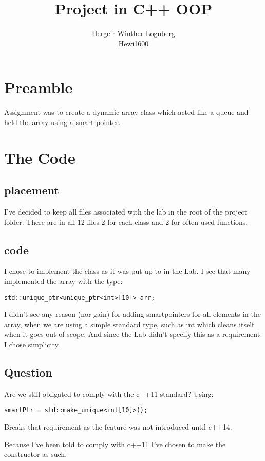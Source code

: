 \documentclass[11pt]{article}
\title{\textbf{Project in C++ OOP}}
\author{Hergeir Winther Lognberg \\
Hewi1600}
\date{}
\begin{document}
\maketitle

\section{Preamble}

Assignment was to create a dynamic array class which acted like a queue and held the array using a smart pointer.

\section{The Code}
\subsection{placement}
I've decided to keep all files associated with the lab in the root of the project folder. There are in all 12 files 2 for each class and 2 for often used functions. 

\subsection{code}
I chose to implement the class as it was put up to in the Lab. I see that many implemented the array with the type:
\begin{lstlisting}
std::unique_ptr<unique_ptr<int>[10]> arr;
\end{lstlisting}

I didn't see any reason (nor gain) for adding smartpointers for all elements in the array, when we are using a simple standard type, such as int which cleans itself when it goes out of scope. And since the Lab didn't specify this as a requirement I chose simplicity.
\subsection{Question}
Are we still obligated to comply with the c++11 standard? Using:
\begin{lstlisting}
smartPtr = std::make_unique<int[10]>();
\end{lstlisting}

Breaks that requirement as the feature was not introduced until c++14.

Because I've been told to comply with c++11 I've chosen to make the constructor as such.
\end{document}
